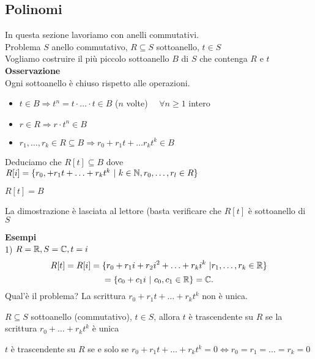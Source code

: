 \documentclass[12px]{article}
\begin{document}
	 \subsection{Polinomi}
	 In questa sezione lavoriamo con anelli commutativi.\\
	 Problema $S$ anello commutativo, $R\subseteq S$ sottoanello, $t\in S$\\
	 Vogliamo costruire il più piccolo sottoanello $B$ di $S$ che contenga $R$ e $t$\\
	 \textbf{Osservazione}\\
	 Ogni sottoanello è chiuso rispetto alle operazioni.\\
	 \begin{itemize}
		 \item $t\in B \Rightarrow t^n = t\cdot\ldots\cdot t\in B$ ($n$ volte) \ \ $\forall n\geq 1$ intero
		 \item  $r\in R \Rightarrow r\cdot t^n \in B$ 
		 \item $r_1,\ldots, r_k\in R\subseteq B \Rightarrow r_0 + r_1t + \ldots r_kt^k\in B$ \\
	 \end{itemize}
	 Deduciamo che $R[t]\subseteq B$ dove $R[i] = \{r_0, + r_1 t + \ldots + r_k t^k \ | \ k\in\mathbb{N}, r_0,\ldots, r_l\in R\}$
	 \begin{prop}
		 $R[t]=B$
	 \end{prop}
	 \begin{dimo}
		 La dimostrazione è lasciata al lettore (basta verificare che $R[t] $ è sottoanello di $S$
	 \end{dimo}
	 \textbf{Esempi}\\
	 1) $R = \mathbb{R}, S=\mathbb{C}, t=i$
	  \[
		  R[t] = R[i] = \{r_0 + r_1i + r_2i^2 + \ldots + r_ki^k \ | r_1,\ldots,r_k\in \mathbb{R}\}
	 \] 
	 \[
	  = \{c_0 + c_1i \ | \ c_0,c_1\in\mathbb{R}\} = \mathbb{C}
	 .\] 
	 Qual'è il problema? La scrittura $r_0 + r_1t + \ldots + r_kt^k$ non è unica.
	 \begin{defi}
	 	$R\subseteq S$ sottoanello (commutativo), $t\in S$, allora $t$ è trascendente su $R$ se la scrittura $r_0 + \ldots + r_kt^k$ è unica
	 \end{defi}
	 \begin{prop}
	 	$t$ è trascendente su $R$ se e solo se $r_0 + r_1t + \ldots + r_kt^k = 0 \Leftrightarrow r_0= r_1= \ldots = r_k = 0$
	 \end{prop}
\end{document}
